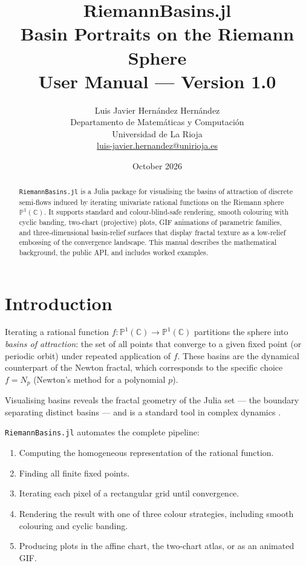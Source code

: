 \documentclass[11pt,a4paper]{article}
\title{%
  \vspace{-1cm}
  {\Large \textbf{RiemannBasins.jl}}\\[4pt]
  {\large Basin Portraits on the Riemann Sphere}\\[6pt]
  {\normalsize User Manual — Version 1.0}
}
\author{%
  Luis Javier Hernández Hernández\\
  \small Departamento de Matemáticas y Computación\\
  \small Universidad de La Rioja\\
  \small \href{mailto:luis-javier.hernandez@unirioja.es}{luis-javier.hernandez@unirioja.es}
}
\date{October 2026}
\theoremstyle{definition}
\newcommand{\C}{\mathbb{C}}
\newcommand{\Pone}{\mathbb{P}^1(\C)}
\newcommand{\pkg}[1]{\texttt{#1}}
\begin{document}

\maketitle
\thispagestyle{empty}

\begin{abstract}
\pkg{RiemannBasins.jl} is a Julia package for visualising the basins of attraction
of discrete semi-flows induced by iterating univariate rational functions on
the Riemann sphere $\Pone$.
It supports standard and colour-blind-safe rendering, smooth colouring with
cyclic banding, two-chart (projective) plots, GIF animations of parametric
families, and three-dimensional basin-relief surfaces that display fractal
texture as a low-relief embossing of the convergence landscape.
This manual describes the mathematical background, the public API, and
includes worked examples.
\end{abstract}

\tableofcontents
\newpage

\section{Introduction}

Iterating a rational function $f:\Pone\to\Pone$ partitions the sphere into
\emph{basins of attraction}: the set of all points that converge to a given
fixed point (or periodic orbit) under repeated application of $f$.
These basins are the dynamical counterpart of the Newton fractal, which
corresponds to the specific choice $f = N_p$ (Newton's method for a
polynomial $p$).

Visualising basins reveals the fractal geometry of the Julia set — the
boundary separating distinct basins — and is a standard tool in complex
dynamics \citep{milnor2006,beardon1991}.

\pkg{RiemannBasins.jl} automates the complete pipeline:

\begin{enumerate}[nosep]
  \item Computing the homogeneous representation of the rational function.
  \item Finding all finite fixed points.
  \item Iterating each pixel of a rectangular grid until convergence.
  \item Rendering the result with one of three colour strategies,
        including smooth colouring and cyclic banding.
  \item Producing plots in the affine chart, the two-chart atlas,
        or as an animated GIF.
\end{enumerate}
\end{document}
